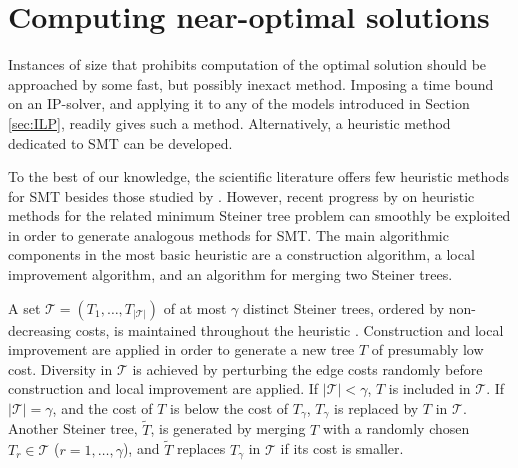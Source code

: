 \section{Computing near-optimal solutions} \label{sec:heur}

Instances of size that prohibits computation of the optimal solution should be approached by some fast, but possibly inexact method.
Imposing a time bound on an IP-solver, and applying it to any of the models introduced in Section \ref{sec:ILP}, readily gives such a method.
Alternatively, a heuristic method dedicated to SMT can be developed.

To the best of our knowledge, the scientific literature offers few heuristic methods for SMT besides those studied by \citet{ivanova16isco}.
However, recent progress by \citet{pajor18} on heuristic methods for the related minimum Steiner tree problem can smoothly be exploited in order to generate analogous methods for SMT.
The main algorithmic components in the most basic heuristic are a construction algorithm, a local improvement algorithm,
and an algorithm for merging two Steiner trees.

A set $\mathcal{T}=\left(T_1,\ldots,T_{|\mathcal{T}|}\right)$ of at most $\gamma$ distinct Steiner trees,
ordered by non-decreasing costs, is maintained throughout the heuristic \citep{pajor18}.
Construction and local improvement are applied in order to generate a new tree $T$ of presumably low cost.
Diversity in $\mathcal{T}$ is achieved by perturbing the edge costs randomly before construction and local improvement are applied.
If $\left|\mathcal{T}\right|<\gamma$, $T$ is included in $\mathcal{T}$.
If $\left|\mathcal{T}\right|=\gamma$, and the cost of $T$ is below the cost of $T_{\gamma}$, $T_{\gamma}$ is replaced by $T$ in $\mathcal{T}$.
Another Steiner tree, $\tilde{T}$, is generated by merging $T$ with a randomly chosen $T_r\in\mathcal{T}$ ($r=1,\ldots,\gamma$),
and $\tilde{T}$ replaces $T_{\gamma}$ in $\mathcal{T}$ if its cost is smaller.

